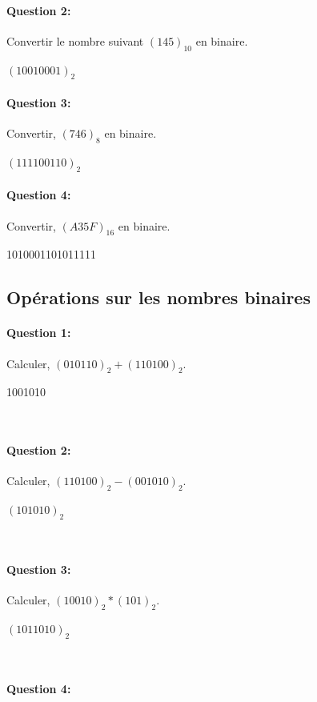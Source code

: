 \paragraph{Question 2:}

Convertir le nombre suivant $(145)_{10}$ en binaire.

$(10010001)_{2}$

\paragraph{Question 3:} Convertir, $(746)_{8}$ en binaire.

$(111100110)_{2}$

\paragraph{Question 4:} Convertir, $(A35F)_{16}$ en binaire.

1010001101011111

\subsection{Opérations sur les nombres binaires}

\paragraph{Question 1:}

Calculer, $(010110)_{2}+(110100)_{2}$.

1001010

~\

\paragraph{Question 2:}

Calculer, $(110100)_{2}-(001010)_{2}$.

$(101010)_{2}$

~\

\paragraph{Question 3:}

Calculer, $(10010)_{2}*(101)_{2}$.

$(1011010)_{2}$

~\

\paragraph{Question 4:}

